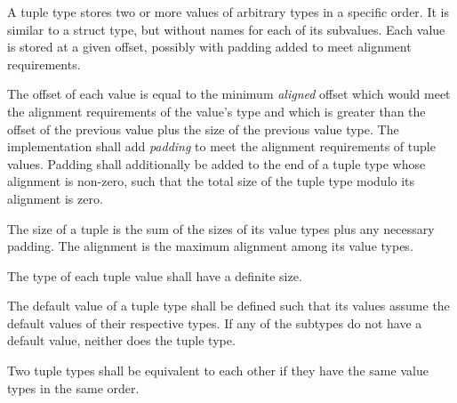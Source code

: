 
\begin{grammar}
 \\
	\terminal{(}  \terminal{)} \\

 \\
	 \terminal{,}  \optional{\terminal{,}}\\
	 \terminal{,}  \\
\end{grammar}

\specsubsubitem
A tuple type stores two or more values of arbitrary types in a specific order.
It is similar to a struct type, but without names for each of its subvalues.
Each value is stored at a given offset, possibly with padding added to meet
alignment requirements.

\specsubsubitem
The offset of each value is equal to the minimum \textit{aligned} offset which
would meet the alignment requirements of the value's type and which is greater
than the offset of the previous value plus the size of the previous value type.
The implementation shall add \textit{padding} to meet the alignment
requirements of tuple values. Padding shall additionally be added to the end of
a tuple type whose alignment is non-zero, such that the total size of the tuple
type modulo its alignment is zero.

\specsubsubitem
The size of a tuple is the sum of the sizes of its value types plus any necessary
padding. The alignment is the maximum alignment among its value types.

\specsubsubitem
The type of each tuple value shall have a definite size.

\specsubsubitem
The default value of a tuple type shall be defined such that its values assume
the default values of their respective types. If any of the subtypes do not
have a default value, neither does the tuple type.

\specsubsubitem
Two tuple types shall be equivalent to each other if they have the same value
types in the same order.


\begin{grammar}
 \\
	\terminal{(}  \terminal{)} \\

 \\
	 \terminal{|}  \optional{\terminal{|}}\\
	 \terminal{|}  \\
\end{grammar}

